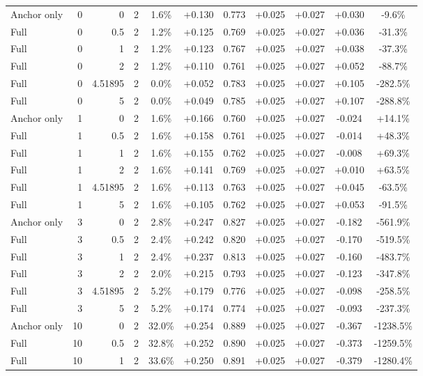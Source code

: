 \begin{table}[htbp]
\begin{tabular}{lrrrccccccc}
Anchor only & 0 & 0 & 2 & 1.6\% & +0.130 & 0.773 & +0.025 & +0.027 & +0.030 & -9.6\% \\
Full & 0 & 0.5 & 2 & 1.2\% & +0.125 & 0.769 & +0.025 & +0.027 & +0.036 & -31.3\% \\
Full & 0 & 1 & 2 & 1.2\% & +0.123 & 0.767 & +0.025 & +0.027 & +0.038 & -37.3\% \\
Full & 0 & 2 & 2 & 1.2\% & +0.110 & 0.761 & +0.025 & +0.027 & +0.052 & -88.7\% \\
Full & 0 & 4.51895 & 2 & 0.0\% & +0.052 & 0.783 & +0.025 & +0.027 & +0.105 & -282.5\% \\
Full & 0 & 5 & 2 & 0.0\% & +0.049 & 0.785 & +0.025 & +0.027 & +0.107 & -288.8\% \\
Anchor only & 1 & 0 & 2 & 1.6\% & +0.166 & 0.760 & +0.025 & +0.027 & -0.024 & +14.1\% \\
Full & 1 & 0.5 & 2 & 1.6\% & +0.158 & 0.761 & +0.025 & +0.027 & -0.014 & +48.3\% \\
Full & 1 & 1 & 2 & 1.6\% & +0.155 & 0.762 & +0.025 & +0.027 & -0.008 & +69.3\% \\
Full & 1 & 2 & 2 & 1.6\% & +0.141 & 0.769 & +0.025 & +0.027 & +0.010 & +63.5\% \\
Full & 1 & 4.51895 & 2 & 1.6\% & +0.113 & 0.763 & +0.025 & +0.027 & +0.045 & -63.5\% \\
Full & 1 & 5 & 2 & 1.6\% & +0.105 & 0.762 & +0.025 & +0.027 & +0.053 & -91.5\% \\
Anchor only & 3 & 0 & 2 & 2.8\% & +0.247 & 0.827 & +0.025 & +0.027 & -0.182 & -561.9\% \\
Full & 3 & 0.5 & 2 & 2.4\% & +0.242 & 0.820 & +0.025 & +0.027 & -0.170 & -519.5\% \\
Full & 3 & 1 & 2 & 2.4\% & +0.237 & 0.813 & +0.025 & +0.027 & -0.160 & -483.7\% \\
Full & 3 & 2 & 2 & 2.0\% & +0.215 & 0.793 & +0.025 & +0.027 & -0.123 & -347.8\% \\
Full & 3 & 4.51895 & 2 & 5.2\% & +0.179 & 0.776 & +0.025 & +0.027 & -0.098 & -258.5\% \\
Full & 3 & 5 & 2 & 5.2\% & +0.174 & 0.774 & +0.025 & +0.027 & -0.093 & -237.3\% \\
Anchor only & 10 & 0 & 2 & 32.0\% & +0.254 & 0.889 & +0.025 & +0.027 & -0.367 & -1238.5\% \\
Full & 10 & 0.5 & 2 & 32.8\% & +0.252 & 0.890 & +0.025 & +0.027 & -0.373 & -1259.5\% \\
Full & 10 & 1 & 2 & 33.6\% & +0.250 & 0.891 & +0.025 & +0.027 & -0.379 & -1280.4\% \\

\end{tabular}
\end{table}
